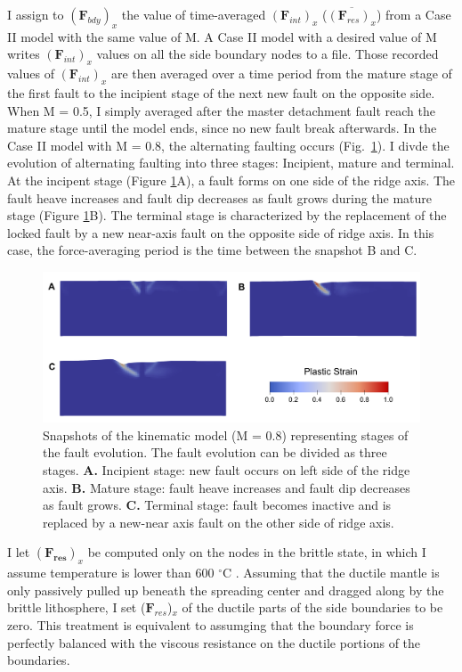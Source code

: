 \documentclass[letterpaper,12pt,notitle]{memphisthesis}                     %
\begin{document}
I assign to $(\boldsymbol{F}_{bdy})_x$ the value of time-averaged $(\boldsymbol{F}_{int})_x$ ($\overline{(\boldsymbol{F}_{res})_x}$) from a Case II model with the same value of M. A Case II model with a desired value of M writes $(\boldsymbol{F}_{int})_x$ values on all the side boundary nodes to a file. Those recorded values of $(\boldsymbol{F}_{int})_{x}$ are then averaged over a time period from the mature stage of the first fault to the incipient stage of the next new fault on the opposite side. 
When M = 0.5, I simply averaged after the master detachment fault reach the mature stage until the model ends, since no new fault break afterwards.
In the Case II model with M = 0.8, the alternating faulting occurs (Fig.~\ref{fig:faultstage}). I divde the evolution of alternating faulting into three stages: Incipient, mature and terminal. At the incipent stage (Figure \ref{fig:faultstage}A), a fault forms on one side of the ridge axis. The fault heave increases and fault dip decreases as fault grows during the mature stage (Figure \ref{fig:faultstage}B). The terminal stage is characterized by the replacement of the locked fault by a new near-axis fault on the opposite side of ridge axis. In this case, the force-averaging period is the time between the snapshot B and C.
%
\begin{figure}[!htb]
	\centering
	\includegraphics[width=0.9\linewidth]{./figs/fault_stage.pdf}
	\caption{Snapshots of the kinematic model (M = 0.8) representing stages of the fault evolution. The fault evolution can be divided as three stages. \textbf{A.} Incipient stage: new fault occurs on left side of the ridge axis. \textbf{B.} Mature stage: fault heave increases and fault dip decreases as fault grows. \textbf{C.} Terminal stage: fault becomes inactive and is replaced by a new-near axis fault on the other side of ridge axis.}
	\label{fig:faultstage}
\end{figure}

I let $(\boldsymbol{F_{res}})_x$ be computed only on the nodes in the brittle state, in which I assume temperature is lower than 600 $^\circ$C \citep[e.g.,][]{Violay2012}. Assuming that the ductile mantle is only passively pulled up beneath the spreading center and dragged along by the brittle lithosphere, I set ($\boldsymbol{F}_{res}$)$_x$ of the ductile parts of the side boundaries to be zero. This treatment is equivalent to assumging that the boundary force is perfectly balanced with the viscous resistance on the ductile portions of the boundaries. %
\end{document}
